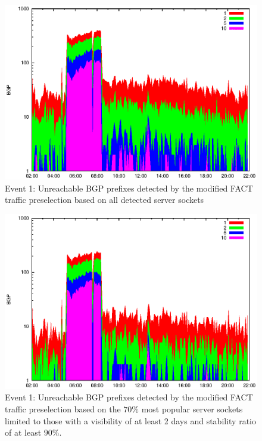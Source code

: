 \begin{figure}
	[p] \centering 
	\includegraphics[width=0.75\linewidth]{images/events/2010_03_25/bgp_log_all_external.eps}
	\caption{Event 1: Unreachable BGP prefixes detected by the modified FACT traffic preselection based on all detected server sockets} 
	\label{fig:AMS_IX_FACT_allSES} 
\end{figure}

\begin{figure}
	[p] \centering 
	\includegraphics[width=0.75\linewidth]{images/events/2010_03_25/bgp_log_Set_var_0_1_stab_9_vts_2.eps}
	\caption{Event 1: Unreachable BGP prefixes detected by the modified FACT traffic preselection based on the $70\%$ most popular server sockets limited to those with a visibility of at least 2 days and stability ratio of at least $90\%$.} 
	\label{fig:AMS_IX_FACT_popularVTS2STAB9} 
\end{figure}


\newpage
